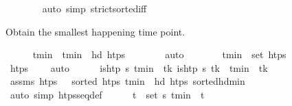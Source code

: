 \begin{isabellebody}
\ \ \ \ \ \ \isamarkupfalse%
\ {\isacharparenleft}{\kern0pt}auto\ simp{\isacharcolon}{\kern0pt}\ strict{\isacharunderscore}{\kern0pt}sorted{\isacharunderscore}{\kern0pt}iff{\isacharparenright}{\kern0pt}%
\begin{isamarkuptext}%
Obtain the smallest happening time point.%
\end{isamarkuptext}\isamarkuptrue%
\ \ \ \ \isamarkupfalse%
\ t\isactrlsub m\isactrlsub i\isactrlsub n\ \ {\isachardoublequoteopen}t\isactrlsub m\isactrlsub i\isactrlsub n\ {\isacharequal}{\kern0pt}\ hd\ htps{\isachardoublequoteclose}\isanewline
\ \ \ \ \ \ \isamarkupfalse%
\ auto\isanewline
\ \ \ \ \isamarkupfalse%
\ \isamarkupfalse%
\ {\isachardoublequoteopen}t\isactrlsub m\isactrlsub i\isactrlsub n\ {\isasymin}\ set\ htps{\isachardoublequoteclose}\isanewline
\ \ \ \ \ \ \isamarkupfalse%
\ {\isacartoucheopen}htps\ {\isasymnoteq}\ {\isacharbrackleft}{\kern0pt}{\isacharbrackright}{\kern0pt}{\isacartoucheclose}\ \isamarkupfalse%
\ auto\isanewline
\ \ \ \ \isamarkupfalse%
\ {\isachardoublequoteopen}is{\isacharunderscore}{\kern0pt}htp\ {\isasympi}s\ t\isactrlsub m\isactrlsub i\isactrlsub n{\isachardoublequoteclose}\ \ {\isachardoublequoteopen}{\isasymforall}t\isactrlsub k{\isachardot}{\kern0pt}\ is{\isacharunderscore}{\kern0pt}htp\ {\isasympi}s\ t\isactrlsub k\ {\isasymlongrightarrow}\ t\isactrlsub m\isactrlsub i\isactrlsub n\ {\isasymle}\ t\isactrlsub k{\isachardoublequoteclose}\isanewline
\ \ \ \ \ \ \isamarkupfalse%
\ assms\ {\isacartoucheopen}htps\ {\isasymnoteq}\ {\isacharbrackleft}{\kern0pt}{\isacharbrackright}{\kern0pt}{\isacartoucheclose}\ {\isacartoucheopen}sorted\ htps{\isacartoucheclose}\ {\isacartoucheopen}t\isactrlsub m\isactrlsub i\isactrlsub n\ {\isacharequal}{\kern0pt}\ hd\ htps{\isacartoucheclose}\ sorted{\isacharunderscore}{\kern0pt}hd{\isacharunderscore}{\kern0pt}min\ \isanewline
\ \ \ \ \ \ \isamarkupfalse%
\ {\isacharparenleft}{\kern0pt}auto\ simp{\isacharcolon}{\kern0pt}\ htps{\isacharunderscore}{\kern0pt}seq{\isacharunderscore}{\kern0pt}def{\isacharparenright}{\kern0pt}\isanewline
\ \ \ \ \isamarkupfalse%
\ {\isachardoublequoteopen}{\isasymforall}{\isacharparenleft}{\kern0pt}t\isactrlsub {\isasympi}{\isacharcomma}{\kern0pt}{\isasympi}{\isacharparenright}{\kern0pt}\ {\isasymin}\ set\ {\isasympi}s{\isachardot}{\kern0pt}\ t\isactrlsub m\isactrlsub i\isactrlsub n\ {\isasymle}\ t\isactrlsub {\isasympi}{\isachardoublequoteclose}\isanewline

\end{isabellebody}
